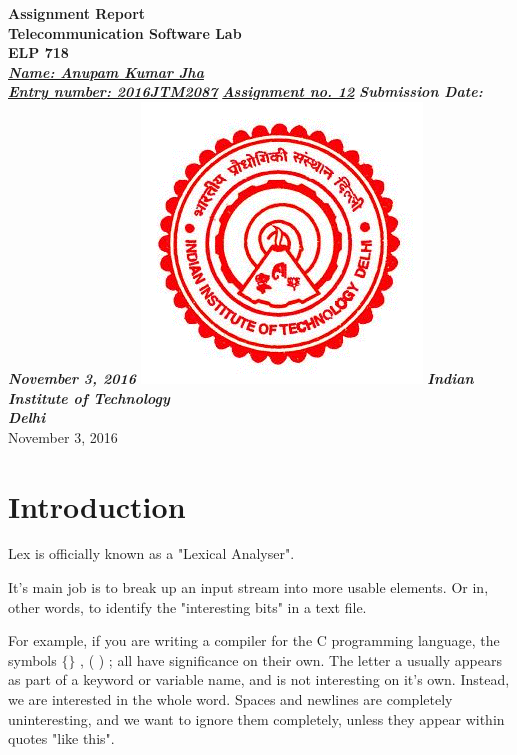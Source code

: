 \documentclass[12pt]{article}
\begin{document}
\begin{titlepage}
\centering
\vfill
\textbf{\Huge{Assignment Report }}\\
\vskip 1cm
\textbf{\Huge{Telecommunication Software Lab  \linebreak \\ELP 718}}\\
\vskip 1cm
\textbf{\Large{\underline{\emph{Name: Anupam Kumar Jha}}}}\\
\vskip 0.5cm
\textbf{\Large{\underline{\emph{Entry number: 2016JTM2087}}}}
\vskip 0.5cm
\textbf{\Large{\underline{\emph{Assignment no. 12}}}}
\vskip 1cm
\Large{\textbf{\emph{Submission Date: November 3, 2016}}}
\vskip 1.5cm
\includegraphics[scale=0.3]{logo.png}
\vskip 0.5cm
\textbf{\emph{Indian Institute of Technology}}\\
\textbf{\emph{Delhi}}\\
     
November 3, 2016
\vfill 
\end{titlepage} 


\begin{center}
\tableofcontents
\end{center}

\newpage
\listoffigures
\newpage

\section{Introduction}


  Lex is officially known as a "Lexical Analyser".

It's main job is to break up an input stream into more usable elements.
Or in, other words, to identify the "interesting bits" in a text file.

For example, if you are writing a compiler for the C programming language, the symbols $\{ \}$ , ( ) ; all have significance on their own. The letter a usually appears as part of a keyword or variable name, and is not interesting on it's own. Instead, we are interested in the whole word. Spaces and newlines are completely uninteresting, and we want to ignore them completely, unless they appear within quotes "like this".
\end{document}
